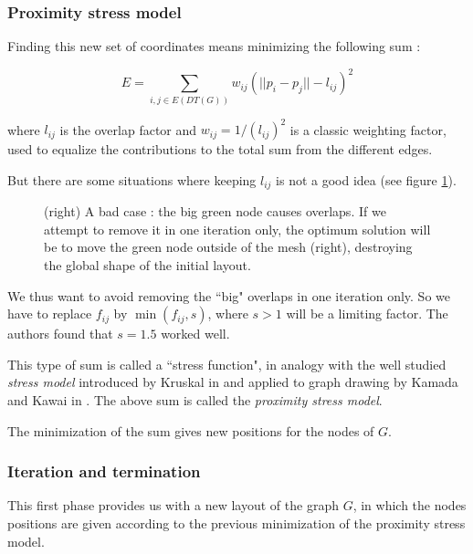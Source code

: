 \documentclass[12pt]{report}
\begin{document}
\subsubsection{Proximity stress model}

Finding this new set of coordinates means minimizing the following sum :

\[ E = \sum_{i,j \in E(DT(G))} w_{ij}(||p_i - p_j|| - l_{ij})^2\]

where $l_{ij}$ is the overlap factor and $w_{ij} = 1/(l_{ij})^2$ is a classic weighting factor, used to equalize the contributions to the total sum from the different edges.


But there are some situations where keeping $l_{ij}$ is not a good idea (see figure \ref{badcase}).

\begin{figure}[h]
	\center
  \setlength\fboxsep{5pt}
  \setlength\fboxrule{0.5pt}
  \caption{(right) A bad case : the big green node causes overlaps. If we attempt to remove it in one iteration only, the optimum solution will be to move the green node outside of the mesh (right), destroying the global shape of the initial layout.}
  \label{badcase}
\end{figure}

We thus want to avoid removing the ``big" overlaps in one iteration only.
So we have to replace $f_{ij}$ by $\min(f_{ij},s)$, where $s > 1$ will be a limiting factor. The authors found that $s = 1.5$ worked well.

This type of sum is called a ``stress function", in analogy with the well studied \emph{stress model} introduced by Kruskal in \cite{Kruskal64} and applied to graph drawing by Kamada and Kawai in \cite{Kamada89}. 
The above sum is called the \emph{proximity stress model}.

\bigskip
The minimization of the sum gives new positions for the nodes of $G$.

\subsubsection{Iteration and termination}
This first phase provides us with a new layout of the graph $G$, in which the nodes positions are given according to the previous minimization of the proximity stress model.
\end{document}
